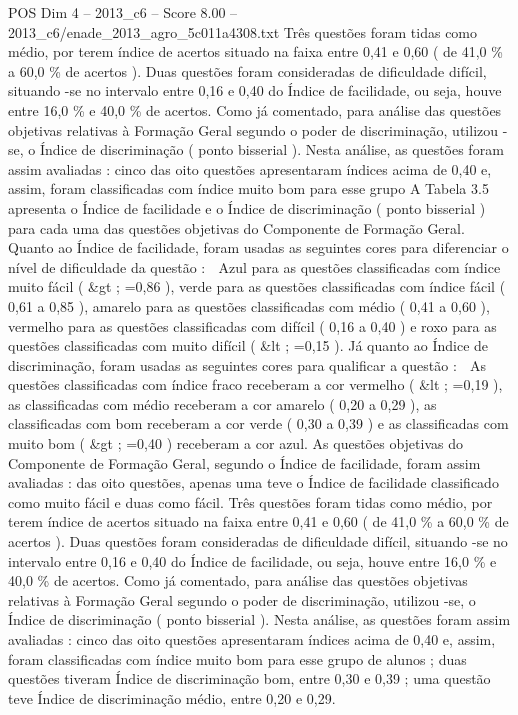 \begin{textsample}{POS Dim 4 – 2013\_c6 – Score 8.00 – 2013\_c6/enade\_2013\_agro\_5c011a4308.txt}
Três questões foram tidas como médio, por terem índice de acertos situado na faixa entre 0,41 e 0,60 ( de 41,0 \% a 60,0 \% de acertos ).
Duas questões foram consideradas de dificuldade difícil, situando -se no intervalo entre 0,16 e 0,40 do Índice de facilidade, ou seja, houve entre 16,0 \% e 40,0 \% de acertos.
Como já comentado, para análise das questões objetivas relativas à Formação Geral segundo o poder de discriminação, utilizou -se, o Índice de discriminação ( ponto bisserial ).
Nesta análise, as questões foram assim avaliadas : cinco das oito questões apresentaram índices acima de 0,40 e, assim, foram classificadas com índice muito bom para esse grupo A Tabela 3.5 apresenta o Índice de facilidade e o Índice de discriminação ( ponto bisserial ) para cada uma das questões objetivas do Componente de Formação Geral.
Quanto ao Índice de facilidade, foram usadas as seguintes cores para diferenciar o nível de dificuldade da questão :  Azul para as questões classificadas com índice muito fácil ( \&gt ; =0,86 ), verde para as questões classificadas com índice fácil ( 0,61 a 0,85 ), amarelo para as questões classificadas com médio ( 0,41 a 0,60 ), vermelho para as questões classificadas com difícil ( 0,16 a 0,40 ) e roxo para as questões classificadas com muito difícil ( \&lt ; =0,15 ).
Já quanto ao Índice de discriminação, foram usadas as seguintes cores para qualificar a questão :  As questões classificadas com índice fraco receberam a cor vermelho ( \&lt ; =0,19 ), as classificadas com médio receberam a cor amarelo ( 0,20 a 0,29 ), as classificadas com bom receberam a cor verde ( 0,30 a 0,39 ) e as classificadas com muito bom ( \&gt ; =0,40 ) receberam a cor azul.
As questões objetivas do Componente de Formação Geral, segundo o Índice de facilidade, foram assim avaliadas : das oito questões, apenas uma teve o Índice de facilidade classificado como muito fácil e duas como fácil.
Três questões foram tidas como médio, por terem índice de acertos situado na faixa entre 0,41 e 0,60 ( de 41,0 \% a 60,0 \% de acertos ).
Duas questões foram consideradas de dificuldade difícil, situando -se no intervalo entre 0,16 e 0,40 do Índice de facilidade, ou seja, houve entre 16,0 \% e 40,0 \% de acertos.
Como já comentado, para análise das questões objetivas relativas à Formação Geral segundo o poder de discriminação, utilizou -se, o Índice de discriminação ( ponto bisserial ).
Nesta análise, as questões foram assim avaliadas : cinco das oito questões apresentaram índices acima de 0,40 e, assim, foram classificadas com índice muito bom para esse grupo de alunos ; duas questões tiveram Índice de discriminação bom, entre 0,30 e 0,39 ; uma questão teve Índice de discriminação médio, entre 0,20 e 0,29.

\end{textsample}
